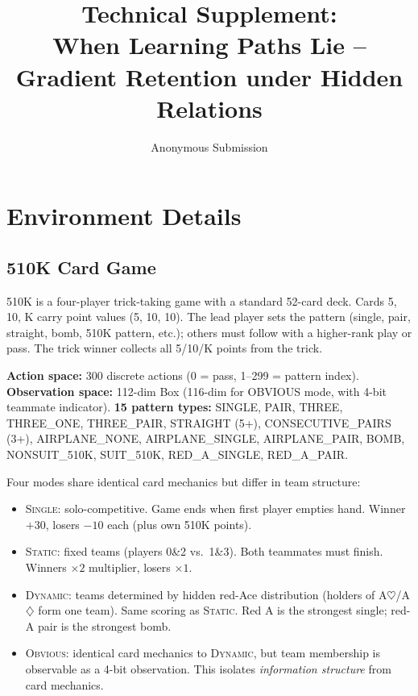 \documentclass[letterpaper]{article}
\title{Technical Supplement:\\When Learning Paths Lie -- Gradient Retention under Hidden Relations}
\author{Anonymous Submission}
\begin{document}
\maketitle

\section{Environment Details}

\subsection{510K Card Game}

510K is a four-player trick-taking game with a standard 52-card deck.
Cards 5, 10, K carry point values (5, 10, 10).
The lead player sets the pattern (single, pair, straight, bomb, 510K pattern, etc.); others must follow with a higher-rank play or pass.
The trick winner collects all 5/10/K points from the trick.

\medskip
\noindent\textbf{Action space:} 300 discrete actions (0 = pass, 1--299 = pattern index).
\noindent\textbf{Observation space:} 112-dim Box (116-dim for OBVIOUS mode, with 4-bit teammate indicator).
\noindent\textbf{15 pattern types:} SINGLE, PAIR, THREE, THREE\_ONE, THREE\_PAIR, STRAIGHT (5+), CONSECUTIVE\_PAIRS (3+), AIRPLANE\_NONE, AIRPLANE\_SINGLE, AIRPLANE\_PAIR, BOMB, NONSUIT\_510K, SUIT\_510K, RED\_A\_SINGLE, RED\_A\_PAIR.

\medskip
\noindent Four modes share identical card mechanics but differ in team structure:

\begin{itemize}
\item \textsc{Single}: solo-competitive. Game ends when first player empties hand.
  Winner $+30$, losers $-10$ each (plus own 510K points).
\item \textsc{Static}: fixed teams (players 0\&2 vs.\ 1\&3). Both teammates must finish.
  Winners $\times 2$ multiplier, losers $\times 1$.
\item \textsc{Dynamic}: teams determined by hidden red-Ace distribution (holders of
  A$\heartsuit$/A$\diamondsuit$ form one team). Same scoring as \textsc{Static}.
  Red A is the strongest single; red-A pair is the strongest bomb.
\item \textsc{Obvious}: identical card mechanics to \textsc{Dynamic}, but team membership
  is observable as a 4-bit observation. This isolates \textit{information structure}
  from card mechanics.
\end{itemize}
\end{document}
